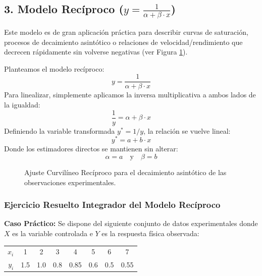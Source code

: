 \documentclass[11pt,a4paper]{article}
\begin{document}
\subsection{3. Modelo Recíproco ($y = \frac{1}{\alpha + \beta \cdot x}$)}
    Este modelo es de gran aplicación práctica para describir curvas de saturación, procesos de decaimiento asintótico o relaciones de velocidad/rendimiento que decrecen rápidamente sin volverse negativas (ver Figura \ref{fig:reciproca}).

    Planteamos el modelo recíproco:
    \[ y = \frac{1}{\alpha + \beta \cdot x} \]
    Para linealizar, simplemente aplicamos la inversa multiplicativa a ambos lados de la igualdad:
    \begin{equation}
        \frac{1}{y} = \alpha + \beta \cdot x
    \end{equation}
    Definiendo la variable transformada $y^* = 1/y$, la relación se vuelve lineal:
    \[ y^* = a + b \cdot x \]
    Donde los estimadores directos se mantienen sin alterar:
    \[ \alpha = a \quad \text{y} \quad \beta = b \]

    \begin{figure}[htbp]
        \centering
        \caption{Ajuste Curvilíneo Recíproco para el decaimiento asintótico de las observaciones experimentales.}
        \label{fig:reciproca}
    \end{figure}

    \subsubsection*{Ejercicio Resuelto Integrador del Modelo Recíproco}
    \textbf{Caso Práctico:} Se dispone del siguiente conjunto de datos experimentales donde $X$ es la variable controlada e $Y$ es la respuesta física observada:
    \begin{table}[h!]
        \centering
        \begin{tabular}{rccccccc}
            \toprule
            \textbf{$x_i$} & 1 & 2 & 3 & 4 & 5 & 6 & 7 \\
            \textbf{$y_i$} & 1.5 & 1.0 & 0.8 & 0.85 & 0.6 & 0.5 & 0.55 \\
            \bottomrule
        \end{tabular}
    \end{table}
\end{document}
